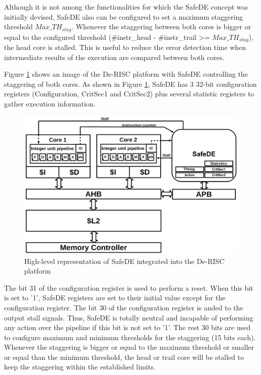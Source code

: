 Although it is not among the functionalities for which the SafeDE concept was initially devised, SafeDE also can be configured to set a maximum staggering threshold $Max\_TH_{stag}$. Whenever the staggering between both cores is bigger or equal to the configured threshold (\#instr\_head - \#instr\_trail >= $Max\_TH_{stag}$), the head core is stalled. This is useful to reduce the error detection time when intermediate results of the execution are compared between both cores.

Figure \ref{fig:De-RISC_SafeDE} shows an image of the De-RISC platform with SafeDE controlling the staggering of both cores. As shown in Figure \ref{fig:De-RISC_SafeDE}, SafeDE has 3 32-bit configuration registers (Configuration, CritSec1 and CritSec2) plus several statistic registers to gather execution information.

\begin{figure}[h]
    \centering
    \includegraphics[scale=0.25]{img/system.png}
    \caption{High-level representation of SafeDE integrated into the De-RISC platform}
    \label{fig:De-RISC_SafeDE}
\end{figure}

The bit 31 of the configuration register is used to perform a reset. When this bit is set to '1', SafeDE registers are set to their initial value except for the configuration register. The bit 30 of the configuration register is anded to the output stall signals. Thus, SafeDE is totally neutral and incapable of performing any action over the pipeline if this bit is not set to '1'. The rest 30 bits are used to configure maximum and minimum thresholds for the staggering (15 bits each). Whenever the staggering is bigger or equal to the maximum threshold or smaller or equal than the minimum threshold, the head or trail core will be stalled to keep the staggering within the established limits.  

